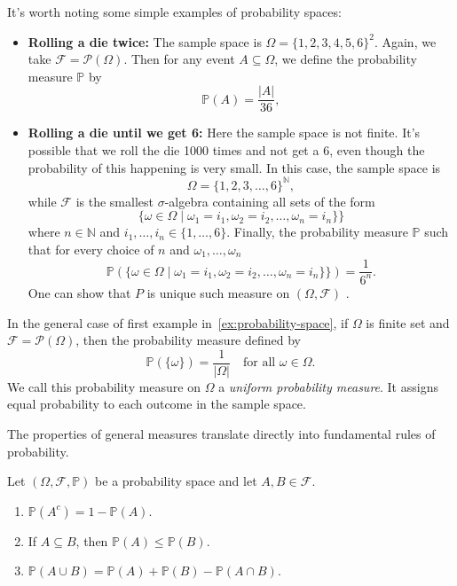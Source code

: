 \begin{example}{\label{ex:probability-space}}
    It's worth noting some simple examples of probability spaces:
    \begin{itemize}
        \item \textbf{Rolling a die twice:} The sample space is $\Omega = \{1, 2, 3, 4, 5, 6\}^2$. Again, we take $\mathcal{F} = \mathcal{P}(\Omega)$. Then for any event $A \subseteq \Omega$, we define the probability measure $\mathbb{P}$ by
        \[
            \mathbb{P}(A) = \frac{|A|}{36},
        \]
        \item \textbf{Rolling a die until we get 6:} Here the sample space is not finite. It's possible that we roll the die 1000 times and not get a 6, even though the probability of this happening is very small. In this case, the sample space is
        \[
            \Omega = \{1, 2, 3, \dots, 6\}^{\mathbb{N}},
        \]
        while $\mathcal{F}$ is the smallest $\sigma$-algebra containing all sets of the form
        \[
            \{\omega \in \Omega \mid \omega_1 = i_1, \omega_2 = i_2, \dots, \omega_n = i_n\}\}
        \]
        where $n \in \mathbb{N}$ and $i_1, \dots, i_n \in \{1, \dots, 6\}$. Finally, the probability measure $\mathbb{P}$ such that for every choice of $n$ and $\omega_1, \dots, \omega_n$
        \[
            \mathbb{P}( \{\omega \in \Omega \mid \omega_1 = i_1, \omega_2 = i_2, \dots, \omega_n = i_n\}\}) = \frac{1}{6^n}.
        \]
        One can show that $P$ is unique such measure on $(\Omega, \mathcal{F})$ \cite[Chap 8]{MeasureTheoryLeGall}.
    \end{itemize}
\end{example}

In the general case of first example in~\ref{ex:probability-space}, if $\Omega$ is finite set and $\mathcal{F} = \mathcal{P}(\Omega)$, then the probability measure defined by
\[
    \mathbb{P}(\{\omega\}) = \frac{1}{|\Omega|} \quad \text{for all } \omega \in \Omega.
\]
We call this probability measure on $\Omega$ a \emph{uniform probability measure}. It assigns equal probability to each outcome in the sample space.

The properties of general measures translate directly into fundamental rules of probability.

\begin{lemma}
    Let $(\Omega, \mathcal{F}, \mathbb{P})$ be a probability space and let $A, B \in \mathcal{F}$.
    \begin{enumerate}
        \item $\mathbb{P}(A^c) = 1 - \mathbb{P}(A)$.
        \item If $A \subseteq B$, then $\mathbb{P}(A) \leq \mathbb{P}(B)$.
        \item $\mathbb{P}(A \cup B) = \mathbb{P}(A) + \mathbb{P}(B) - \mathbb{P}(A \cap B)$.
    \end{enumerate}
\end{lemma}

